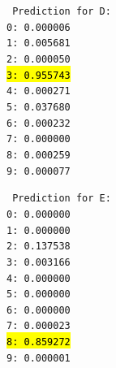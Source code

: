 \begin{qsolve}
\begin{latin}
\noindent\begin{multicols}{2}
	\texttt{%
		Prediction for D:\\
		0: 0.000006\\
		1: 0.005681\\
		2: 0.000050\\
		\hl{3: 0.955743}\\
		4: 0.000271\\
		5: 0.037680\\
		6: 0.000232\\
		7: 0.000000\\
		8: 0.000259\\
		9: 0.000077
	}
	
	
	\texttt{%
		Prediction for E:\\
		0: 0.000000\\
		1: 0.000000\\
		2: 0.137538\\
		3: 0.003166\\
		4: 0.000000\\
		5: 0.000000\\
		6: 0.000000\\
		7: 0.000023\\
		\hl{8: 0.859272}\\
		9: 0.000001
	}
\end{multicols}
\end{latin}
\end{qsolve}


